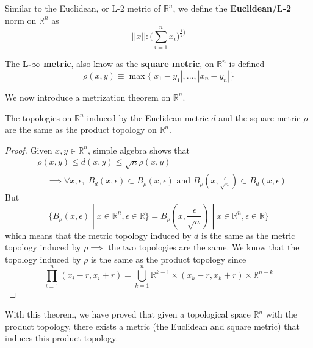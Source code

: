 \documentclass{article}
\begin{document}
    \begin{definition}
    Similar to the Euclidean, or L-2 metric of $\mathbb{R}^n$, we define the \textbf{Euclidean/L-2} norm on $\mathbb{R}^n$ as
    \[||x||: \bigg( \sum_{i=1}^n x_i \bigg)^{\frac{1}{2})}\]
    \end{definition}

    \begin{definition}
    The \textbf{L-$\infty$ metric}, also know as the \textbf{square metric}, on $\mathbb{R}^n$ is defined 
    \[\rho(x, y) \equiv \max{\{|x_1 - y_1|, ..., |x_n - y_n|\}}\]
    \end{definition}

    We now introduce a metrization theorem on $\mathbb{R}^n$. 

    \begin{theorem}
    The topologies on $\mathbb{R}^n$ induced by the Euclidean metric $d$ and the square metric $\rho$ are the same as the product topology on $\mathbb{R}^n$. 
    \end{theorem}
    \begin{proof}
    Given $x, y \in \mathbb{R}^n$, simple algebra shows that 
    \begin{align*}
        & \rho(x, y) \leq d(x, y) \leq \sqrt{n} \rho(x, y) \\
        & \;\;\;\; \implies \forall x, \epsilon, \; B_d (x, \epsilon) \subset B_\rho (x, \epsilon) \text{ and } B_\rho (x, \frac{\epsilon}{\sqrt{n}}) \subset B_d (x, \epsilon)
    \end{align*}
    But
    \[\{ B_\rho (x, \epsilon) \; | \; x \in \mathbb{R}^n, \epsilon \in \mathbb{R}\} = B_\rho (x, \frac{\epsilon}{\sqrt{n}}) \; | \; x \in \mathbb{R}^n, \epsilon \in \mathbb{R}\}\]
    which means that the metric topology induced by $d$ is the same as the metric topology induced by $\rho \implies$ the two topologies are the same. We know that the topology induced by $\rho$ is the same as the product topology since 
    \[\prod_{i=1}^n (x_i - r, x_i + r) = \bigcup_{k=1}^n \mathbb{R}^{k-1} \times (x_k - r, x_k + r) \times \mathbb{R}^{n-k}\]
    \end{proof}
    With this theorem, we have proved that given a topological space $\mathbb{R}^n$ with the product topology, there exists a metric (the Euclidean and square metric) that induces this product topology. 
\end{document}
